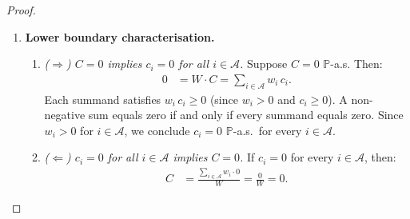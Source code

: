\documentclass[12pt,openany]{book}
\newcommand{\calF}{\mathcal{F}}
\newcommand{\Prob}{\mathbb{P}}
\numberwithin{equation}{chapter}
\theoremstyle{plain}
\theoremstyle{definition}
\theoremstyle{remark}
\numberwithin{equation}{chapter}
\theoremstyle{plain}
\begin{document}
\begin{proof}
\begin{enumerate}
\begin{enumerate}
    \item \emph{Closure under finite sums.}
      A finite sum of $\calF_t$-measurable functions is
      $\calF_t$-measurable; hence
      \begin{align}
        \sum_{i=1}^{n} w_i\, c_i
          \quad\text{and}\quad
        \sum_{i=1}^{n} w_i\, u_i
          \quad\text{and}\quad
        W = \sum_{i=1}^{n} w_i
      \end{align}
      are all $\calF_t$-measurable.

    \item \emph{Closure under division with a.s.\ non-zero
      denominator.}
      By item~1, $W > 0$ $\Prob$-a.s.  The ratio of two
      $\calF_t$-measurable functions whose denominator is
      $\Prob$-a.s.\ strictly positive is itself
      $\calF_t$-measurable.  Therefore:
      \begin{align}
        C
          &= \frac{\sum_{i=1}^{n} w_i\, c_i}{W}
          \quad\text{is } \calF_t\text{-measurable},\\
        U
          &= \frac{\sum_{i=1}^{n} w_i\, u_i}{W}
          \quad\text{is } \calF_t\text{-measurable}.
      \end{align}
  \end{enumerate}

  \item \textbf{Lower boundary characterisation.}

  \begin{enumerate}
    \item \emph{($\Rightarrow$) $C = 0$ implies $c_i = 0$
      for all $i \in \mathcal{A}$.}
      Suppose $C = 0$ $\Prob$-a.s.  Then:
      \begin{align}
        0
          &= W \cdot C
           = \sum_{i \in \mathcal{A}} w_i\, c_i.
      \end{align}
      Each summand satisfies $w_i\, c_i \geq 0$ (since
      $w_i > 0$ and $c_i \geq 0$).  A non-negative sum
      equals zero if and only if every summand equals zero.
      Since $w_i > 0$ for $i \in \mathcal{A}$, we conclude
      $c_i = 0$ $\Prob$-a.s.\ for every
      $i \in \mathcal{A}$.

    \item \emph{($\Leftarrow$) $c_i = 0$ for all
      $i \in \mathcal{A}$ implies $C = 0$.}
      If $c_i = 0$ for every $i \in \mathcal{A}$, then:
      \begin{align}
        C
          &= \frac{\sum_{i \in \mathcal{A}} w_i \cdot 0}{W}
           = \frac{0}{W}
           = 0.
      \end{align}


\end{enumerate}
\end{enumerate}
\end{proof}
\end{document}
